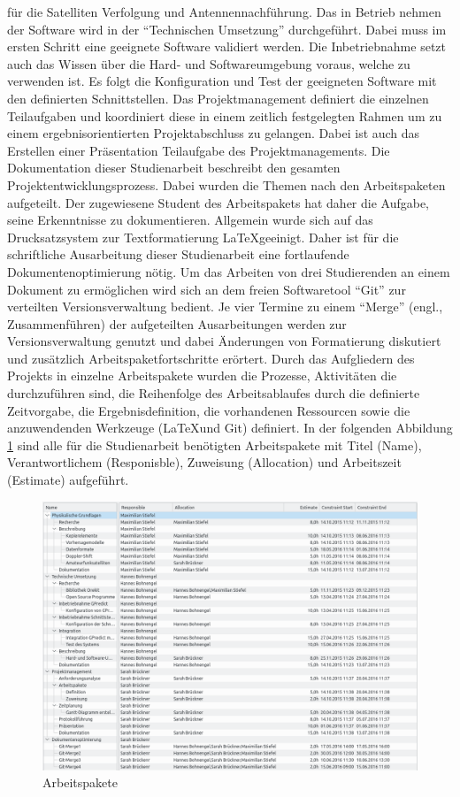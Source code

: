 für die Satelliten Verfolgung und  Antennennachführung. Das in Betrieb nehmen der Software wird in der ``Technischen Umsetzung'' 
durchgeführt. Dabei muss im ersten Schritt eine geeignete Software validiert werden. Die 
Inbetriebnahme setzt auch das Wissen über die Hard- und Softwareumgebung voraus, welche zu 
verwenden ist. Es folgt die Konfiguration und Test der geeigneten Software mit den definierten 
Schnittstellen.
\newpar
Das Projektmanagement definiert die einzelnen Teilaufgaben und koordiniert diese in einem zeitlich 
festgelegten Rahmen um zu einem ergebnisorientierten Projektabschluss zu gelangen. Dabei ist auch 
das Erstellen einer Präsentation Teilaufgabe des Projektmanagements.
\newpar
Die Dokumentation dieser Studienarbeit beschreibt den gesamten Projektentwicklungsprozess. Dabei wurden die Themen nach den Arbeitspaketen 
aufgeteilt. Der zugewiesene Student des Arbeitspakets hat daher die Aufgabe, seine Erkenntnisse zu dokumentieren. Allgemein wurde sich 
auf das Drucksatzsystem zur Textformatierung \LaTeX geeinigt. Daher ist für die schriftliche Ausarbeitung dieser Studienarbeit eine 
fortlaufende Dokumentenoptimierung nötig. Um das Arbeiten von drei Studierenden an einem Dokument zu ermöglichen wird sich an dem freien 
Softwaretool ``Git'' zur verteilten Versionsverwaltung bedient. Je vier Termine zu einem ``Merge'' (engl., Zusammenführen) der 
aufgeteilten Ausarbeitungen werden zur Versionsverwaltung genutzt und dabei Änderungen von Formatierung diskutiert und zusätzlich 
Arbeitspaketfortschritte erörtert. 
\newpar
Durch das Aufgliedern des Projekts in einzelne Arbeitspakete wurden die Prozesse, Aktivitäten die durchzuführen sind, die Reihenfolge des 
Arbeitsablaufes durch die definierte Zeitvorgabe, die Ergebnisdefinition, die vorhandenen Ressourcen sowie die anzuwendenden Werkzeuge (\LaTeX und 
Git) definiert.  
In der folgenden Abbildung \ref{fig:arbeitspaket} sind alle für die Studienarbeit benötigten 
Arbeitspakete mit Titel (Name), Verantwortlichem (Responisble), Zuweisung (Allocation) und 
Arbeitszeit (Estimate) aufgeführt.
\begin{figure}[h] 
 \centering
\includegraphics[width=1.0\linewidth]{./images/03task}
\caption{Arbeitspakete}
 \label{fig:arbeitspaket}
\end{figure}
\newpage

